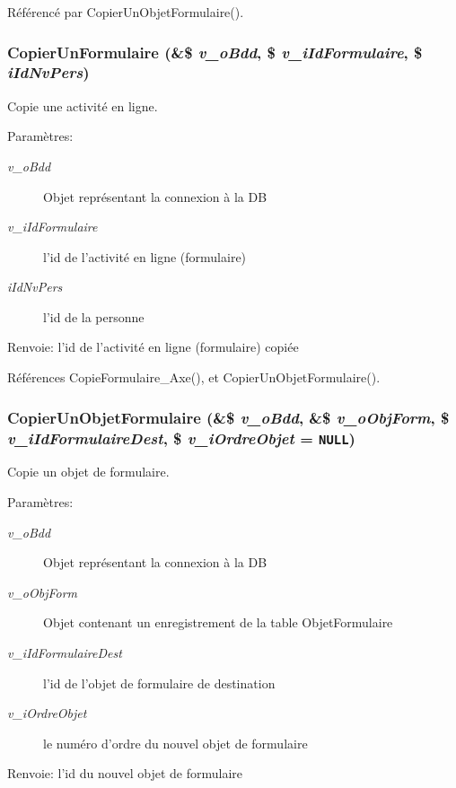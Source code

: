 Référencé par CopierUnObjetFormulaire().
\subsubsection{\setlength{\rightskip}{0pt plus 5cm}CopierUnFormulaire (\&\$ {\em v\_\-oBdd}, \/  \$ {\em v\_\-iIdFormulaire}, \/  \$ {\em iIdNvPers})}\label{fonctions__form_8inc_8php_3c92dd8530b76e472d93667bfde22374}


Copie une activité en ligne. 

\begin{Desc}
\item[Paramètres:]
\begin{description}
\item[{\em v\_\-oBdd}]Objet représentant la connexion à la DB \item[{\em v\_\-iIdFormulaire}]l'id de l'activité en ligne (formulaire) \item[{\em iIdNvPers}]l'id de la personne\end{description}
\end{Desc}
\begin{Desc}
\item[Renvoie:]l'id de l'activité en ligne (formulaire) copiée \end{Desc}


Références CopieFormulaire\_\-Axe(), et CopierUnObjetFormulaire().
\subsubsection{\setlength{\rightskip}{0pt plus 5cm}CopierUnObjetFormulaire (\&\$ {\em v\_\-oBdd}, \/  \&\$ {\em v\_\-oObjForm}, \/  \$ {\em v\_\-iIdFormulaireDest}, \/  \$ {\em v\_\-iOrdreObjet} = {\tt NULL})}\label{fonctions__form_8inc_8php_de03d16812ef29364f08c02333b59fc4}


Copie un objet de formulaire. 

\begin{Desc}
\item[Paramètres:]
\begin{description}
\item[{\em v\_\-oBdd}]Objet représentant la connexion à la DB \item[{\em v\_\-oObjForm}]Objet contenant un enregistrement de la table ObjetFormulaire \item[{\em v\_\-iIdFormulaireDest}]l'id de l'objet de formulaire de destination \item[{\em v\_\-iOrdreObjet}]le numéro d'ordre du nouvel objet de formulaire\end{description}
\end{Desc}
\begin{Desc}
\item[Renvoie:]l'id du nouvel objet de formulaire \end{Desc}


